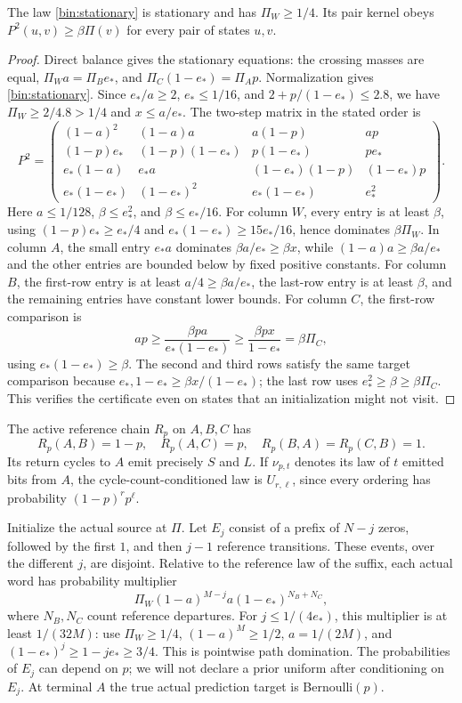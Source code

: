 \begin{lemma}
\label{bin:certificate}
The law \eqref{bin:stationary} is stationary and has $\Pi_W\ge1/4$. Its pair kernel obeys $P^2(u,v)\ge\beta\Pi(v)$ for every pair of states $u,v$.
\end{lemma}
\begin{proof}
Direct balance gives the stationary equations: the crossing masses are equal, $\Pi_W a=\Pi_B e_*$, and $\Pi_C(1-e_*)=\Pi_Ap$. Normalization gives \eqref{bin:stationary}. Since $e_*/a\ge2$, $e_*\le1/16$, and $2+p/(1-e_*)\le2.8$, we have $\Pi_W\ge2/4.8>1/4$ and $x\le a/e_*$. The two-step matrix in the stated order is
\[
 P^2=\begin{pmatrix}
 (1-a)^2&(1-a)a&a(1-p)&ap\\
 (1-p)e_*&(1-p)(1-e_*)&p(1-e_*)&pe_*\\
 e_*(1-a)&e_*a&(1-e_*)(1-p)&(1-e_*)p\\
 e_*(1-e_*)&(1-e_*)^2&e_*(1-e_*)&e_*^2
 \end{pmatrix}.
\]
Here $a\le1/128$, $\beta\le e_*^2$, and $\beta\le e_*/16$. For column $W$, every entry is at least $\beta$, using $(1-p)e_*\ge e_*/4$ and $e_*(1-e_*)\ge15e_*/16$, hence dominates $\beta\Pi_W$. In column $A$, the small entry $e_*a$ dominates $\beta a/e_*\ge\beta x$, while $(1-a)a\ge\beta a/e_*$ and the other entries are bounded below by fixed positive constants. For column $B$, the first-row entry is at least $a/4\ge\beta a/e_*$, the last-row entry is at least $\beta$, and the remaining entries have constant lower bounds. For column $C$, the first-row comparison is
\[
 ap\ge\frac{\beta pa}{e_*(1-e_*)}\ge\frac{\beta px}{1-e_*}=\beta\Pi_C,
\]
using $e_*(1-e_*)\ge\beta$. The second and third rows satisfy the same target comparison because $e_*,1-e_*\ge\beta x/(1-e_*)$; the last row uses $e_*^2\ge\beta\ge\beta\Pi_C$. This verifies the certificate even on states that an initialization might not visit.
\end{proof}

The active reference chain $R_p$ on $A,B,C$ has
\[
 R_p(A,B)=1-p,\quad R_p(A,C)=p,\quad R_p(B,A)=R_p(C,B)=1.
\]
Its return cycles to $A$ emit precisely $S$ and $L$. If $\nu_{p,t}$ denotes its law of $t$ emitted bits from $A$, the cycle-count-conditioned law is $U_{r,\ell}$, since every ordering has probability $(1-p)^r p^\ell$.

Initialize the actual source at $\Pi$. Let $E_j$ consist of a prefix of $N-j$ zeros, followed by the first $1$, and then $j-1$ reference transitions. These events, over the different $j$, are disjoint. Relative to the reference law of the suffix, each actual word has probability multiplier
\begin{equation}
 \Pi_W(1-a)^{M-j}a(1-e_*)^{N_B+N_C},
 \label{bin:density}
\end{equation}
where $N_B,N_C$ count reference departures. For $j\le1/(4e_*)$, this multiplier is at least $1/(32M)$: use $\Pi_W\ge1/4$, $(1-a)^M\ge1/2$, $a=1/(2M)$, and $(1-e_*)^j\ge1-je_*\ge3/4$. This is pointwise path domination. The probabilities of $E_j$ can depend on $p$; we will not declare a prior uniform after conditioning on $E_j$. At terminal $A$ the true actual prediction target is Bernoulli$(p)$.

